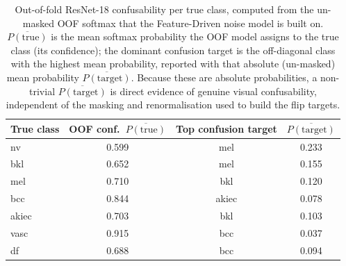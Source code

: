 \begin{table}[h!]
\centering
\begin{tabular}{lccc}
\toprule
True class & OOF conf.\ $\overline{P(\text{true})}$ & Top confusion target & $\overline{P(\text{target})}$ \\
\midrule
nv & 0.599 & mel & 0.233 \\
bkl & 0.652 & mel & 0.155 \\
mel & 0.710 & bkl & 0.120 \\
bcc & 0.844 & akiec & 0.078 \\
akiec & 0.703 & bkl & 0.103 \\
vasc & 0.915 & bcc & 0.037 \\
df & 0.688 & bcc & 0.094 \\
\bottomrule
\end{tabular}
\caption{Out-of-fold ResNet-18 confusability per true class, computed from the un-masked OOF softmax that the Feature-Driven noise model is built on. $\overline{P(\text{true})}$ is the mean softmax probability the OOF model assigns to the true class (its confidence); the dominant confusion target is the off-diagonal class with the highest mean probability, reported with that absolute (un-masked) mean probability $\overline{P(\text{target})}$. Because these are absolute probabilities, a non-trivial $\overline{P(\text{target})}$ is direct evidence of genuine visual confusability, independent of the masking and renormalisation used to build the flip targets.}
\label{tab:oof-confusability}
\end{table}
